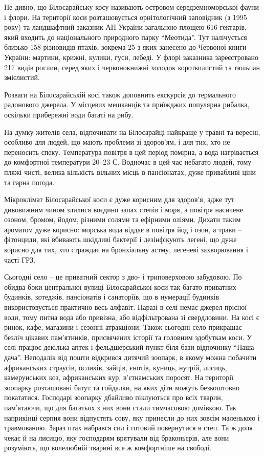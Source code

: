 Не дивно, що Білосарайську косу називають островом середземноморської фауни і
флори. На території коси розташовується орнітологічний заповідник (з 1995 року)
та ландшафтний заказник АН України загальною площею 616 гектарів, який входить
до національного природного парку \enquote{Меотида}. Тут налічується близько 158
різновидів птахів, зокрема 25 з яких занесено до Червоної книги України:
мартини, крижні, кулики, гуси, лебеді. У флорі заказника зареєстровано 217
видів рослин, серед яких і червонокнижні холодок коротколистий та тюльпан
змієлистий.

Розваги на Білосарайській косі також доповнить екскурсія до термального
радонового джерела. У місцевих мешканців та приїжджих популярна рибалка,
оскільки прибережні води багаті на рибу.


На думку жителів села, відпочивати на Білосарайці найкраще у травні та вересні,
особливо для людей, що мають проблеми зі здоров'ям, і для тих, хто не
переносить спеку. Температура повітря в цей період помірна, а вода нагрівається
до комфортної температури 20–23 С. Водночас в цей час небагато людей, тому
пляжі чисті, велика кількість вільних місць в пансіонатах, дуже привабливі ціни
та гарна погода.

Мікроклімат Білосарайської коси є дуже корисним для здоров'я, адже тут
дивовижним чином злилися воєдино запах степів і моря, а повітря насичене
озоном, бромом, йодом, різними солями та ефірними оліями. Дихати таким ароматом
дуже корисно: морська вода віддає в повітря йод і озон, а трави – фітонциди,
які вбивають шкідливі бактерії і дезінфікують легені, що дуже корисно для тих,
хто страждає на бронхіальну астму, легеневі захворювання і часті ГРЗ.

Сьогодні село – це приватний сектор з дво- і триповерховою забудовою. По обидва
боки центральної вулиці Білосарайської коси так багато приватних будинків,
котеджів, пансіонатів і санаторіїв, що в нумерації будинків використовується
практично весь алфавіт. Наразі в селі немає джерел прісної води, тому питна
вода або привізна, або відфільтрована зі свердловини. На косі є ринок, кафе,
магазини і сезонні атракціони. Також  сьогодні село прикрашає безліч цікавих
пам'ятників, присвячених історії та головним здобуткам коси. У селі працює
декілька аптек і фельдшерський пункт біля бази відпочинку \enquote{Наша дача}.
Неподалік від пошти відкрився дитячий зоопарк, в якому можна побачити
африканських страусів, осликів, зайців, єнотів, куниць, нутрій, лисиць,
камерунських коз, африканських кур, в'єтнамських поросят.  На території
зоопарку розташовані батут та гойдалки, на яких діти можуть  безкоштовно
покататися. Господарі зоопарку дбайливо піклуються про всіх тварин, пам'ятаючи,
що для багатьох з них вони стали тимчасовою домівкою. Так наприкінці серпня
вони відпустять сову, яку принесли до них зовсім маленькою і травмованою. Зараз
птах набрався сил і готовий повернутися в степ. Та ж доля чекає й на лисицю,
яку господарям врятували від браконьєрів, але вони розуміють, що волелюбній
тварині все ж комфортніше на свободі. 

